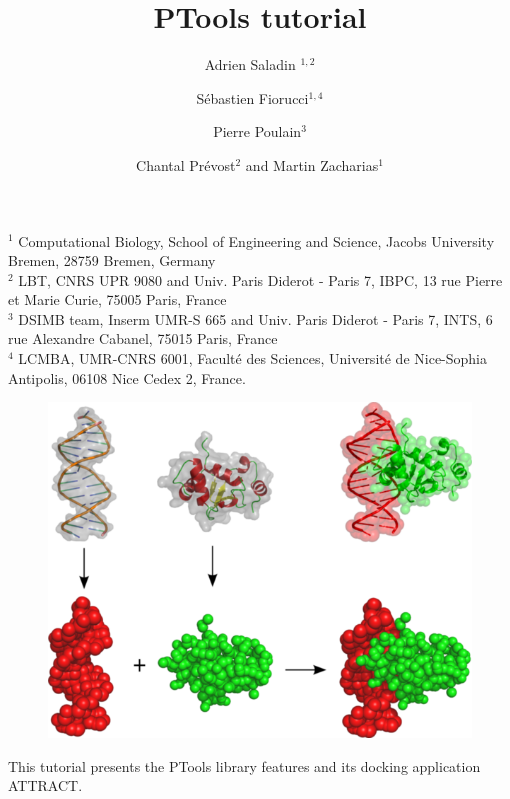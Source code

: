 \documentclass[12pt,a4paper]{article}
\begin{document}
\setlength{\parindent}{0pt}


\title{\bf PTools tutorial}

\author{Adrien Saladin $^{1,2}$
\and S\'ebastien Fiorucci$^{1,4}$
\and Pierre Poulain$^3$
\and Chantal Pr\'evost$^2$
 and Martin Zacharias$^1$
}

\maketitle
\thispagestyle{empty}

\noindent
{\scriptsize
$^1$ Computational Biology, School of Engineering and Science, Jacobs University Bremen, 28759 Bremen, Germany\\
$^2$ LBT, CNRS UPR 9080 and Univ. Paris Diderot - Paris 7, IBPC, 13 rue Pierre et Marie Curie, 75005 Paris, France   \\
$^3$ DSIMB team, Inserm UMR-S 665 and Univ. Paris Diderot - Paris 7, INTS,
6 rue Alexandre Cabanel, 75015 Paris, France   \\
$^4$ LCMBA, UMR-CNRS 6001, Facult\'e des Sciences, Universit\'e de Nice-Sophia Antipolis, 06108 Nice Cedex 2, France. \\
}

\vspace*{2cm}
\begin{figure}[htbp]
\center
\includegraphics*[width=0.80\linewidth]{img/docking.png}
\end{figure}


\vspace*{3cm}

\noindent
This tutorial presents the PTools library features and its docking application ATTRACT.

\newpage
\end{document}
